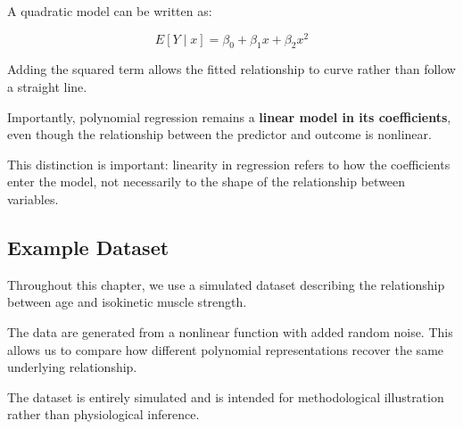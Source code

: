 \documentclass[
  letterpaper,
  DIV=11,
  numbers=noendperiod]{scrreprt}
\newenvironment{Shaded}{\begin{snugshade}}{\end{snugshade}}
\newcommand{\AttributeTok}[1]{\textcolor[rgb]{0.40,0.45,0.13}{#1}}
\newcommand{\CommentTok}[1]{\textcolor[rgb]{0.37,0.37,0.37}{#1}}
\newcommand{\DecValTok}[1]{\textcolor[rgb]{0.68,0.00,0.00}{#1}}
\newcommand{\FloatTok}[1]{\textcolor[rgb]{0.68,0.00,0.00}{#1}}
\newcommand{\FunctionTok}[1]{\textcolor[rgb]{0.28,0.35,0.67}{#1}}
\newcommand{\NormalTok}[1]{\textcolor[rgb]{0.00,0.23,0.31}{#1}}
\newcommand{\OtherTok}[1]{\textcolor[rgb]{0.00,0.23,0.31}{#1}}
\newcommand{\SpecialCharTok}[1]{\textcolor[rgb]{0.37,0.37,0.37}{#1}}
\begin{document}
A quadratic model can be written as:

\[
E[Y \mid x] = \beta_0 + \beta_1 x + \beta_2 x^2
\]

Adding the squared term allows the fitted relationship to curve rather
than follow a straight line.

Importantly, polynomial regression remains a \textbf{linear model in its
coefficients}, even though the relationship between the predictor and
outcome is nonlinear.

This distinction is important: linearity in regression refers to how the
coefficients enter the model, not necessarily to the shape of the
relationship between variables.

\subsection{Example Dataset}\label{example-dataset}

Throughout this chapter, we use a simulated dataset describing the
relationship between age and isokinetic muscle strength.

The data are generated from a nonlinear function with added random
noise. This allows us to compare how different polynomial
representations recover the same underlying relationship.

The dataset is entirely simulated and is intended for methodological
illustration rather than physiological inference.

\begin{Shaded}
\end{Shaded}
\end{document}
